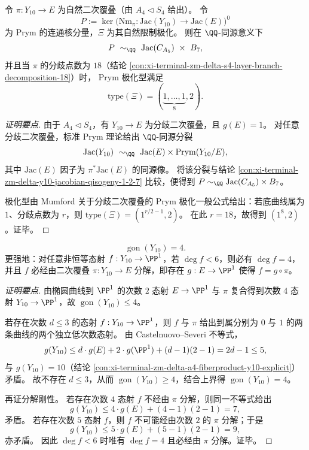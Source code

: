 \begin{conclusion}\label{con:xi-terminal-zm-delta-y10-prym-splitting-polarization-type}
令 \(\pi:Y_{10}\to E\) 为自然二次覆叠（由 \(A_4\lhd S_4\) 给出）。
令
\[
P:=\ker\!\bigl(\mathrm{Nm}_\pi:\mathrm{Jac}(Y_{10})\to \mathrm{Jac}(E)\bigr)^0
\]
为 Prym 的连通核分量，\(\Xi\) 为其自然限制极化。
则在 \(\QQ\)-同源意义下
\[
P\ \sim_{\QQ}\ \mathrm{Jac}(C_{A_5})\ \times\ B_7,
\]
并且当 \(\pi\) 的分歧点数为 \(18\)（结论 \ref{con:xi-terminal-zm-delta-s4-layer-branch-decomposition-18}）时，
Prym 极化型满足
\[
\mathrm{type}(\Xi)=(\underbrace{1,\dots,1}_{8},2).
\]
\end{conclusion}
\begin{proof}[证明要点]
由于 \(A_4\lhd S_4\)，有 \(Y_{10}\to E\) 为分歧二次覆叠，且 \(g(E)=1\)。
对任意分歧二次覆叠，标准 Prym 理论给出 \(\QQ\)-同源分裂
\[
\mathrm{Jac}(Y_{10})\ \sim_{\QQ}\ \mathrm{Jac}(E)\times \mathrm{Prym}(Y_{10}/E),
\]
其中 \(\mathrm{Jac}(E)\) 因子为 \(\pi^*\mathrm{Jac}(E)\) 的同源像。
将该分裂与结论 \ref{con:xi-terminal-zm-delta-y10-jacobian-qisogeny-1-2-7} 比较，便得到
\(
P\sim_{\QQ}\mathrm{Jac}(C_{A_5})\times B_7
\)。
\par
极化型由 Mumford 关于分歧二次覆叠的 Prym 极化一般公式给出：若底曲线属为 \(1\)、分歧点数为 \(r\)，则
\(
\mathrm{type}(\Xi)=(1^{r/2-1},2)
\)。
在此 \(r=18\)，故得到 \((1^8,2)\)。证毕。
\end{proof}

\begin{conclusion}\label{con:xi-terminal-zm-delta-y10-gonality-four-factorization}
\[
\operatorname{gon}(Y_{10})=4.
\]
更强地：对任意非恒等态射 \(f:Y_{10}\to\PP^1\)，若 \(\deg f<6\)，则必有 \(\deg f=4\)，并且 \(f\) 必经由二次覆叠 \(\pi:Y_{10}\to E\) 分解，即存在 \(g:E\to\PP^1\) 使得 \(f=g\circ\pi\)。
\end{conclusion}
\begin{proof}[证明要点]
由椭圆曲线到 \(\PP^1\) 的次数 \(2\) 态射 \(E\to\PP^1\) 与 \(\pi\) 复合得到次数 \(4\) 态射 \(Y_{10}\to\PP^1\)，故 \(\operatorname{gon}(Y_{10})\le 4\)。
\par
若存在次数 \(d\le3\) 的态射 \(f:Y_{10}\to\PP^1\)，则 \(f\) 与 \(\pi\) 给出到属分别为 \(0\) 与 \(1\) 的两条曲线的两个独立低次数态射。
由 Castelnuovo--Severi 不等式，
\[
g(Y_{10})\le d\cdot g(E)+2\cdot g(\PP^1)+(d-1)(2-1)=2d-1\le5,
\]
与 \(g(Y_{10})=10\)（结论 \ref{con:xi-terminal-zm-delta-a4-fiberproduct-y10-explicit}）矛盾。
故不存在 \(d\le 3\)，从而 \(\operatorname{gon}(Y_{10})\ge 4\)，结合上界得 \(\operatorname{gon}(Y_{10})=4\)。
\par
再证分解刚性。
若存在次数 \(4\) 态射 \(f\) 不经由 \(\pi\) 分解，则同一不等式给出
\[
g(Y_{10})\le 4\cdot g(E)+(4-1)(2-1)=7,
\]
矛盾。
若存在次数 \(5\) 态射 \(f\)，则 \(f\) 不可能经由次数 \(2\) 的 \(\pi\) 分解；于是
\[
g(Y_{10})\le 5\cdot g(E)+(5-1)(2-1)=9,
\]
亦矛盾。
因此 \(\deg f<6\) 时唯有 \(\deg f=4\) 且必经由 \(\pi\) 分解。证毕。
\end{proof}

